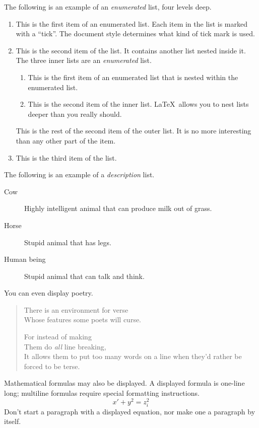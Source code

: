 \documentclass{kluwer}    %
\begin{document}
\begin{article}
The following is an example of an {\em enumerated} list, four levels deep.
\begin{enumerate}
\item  This is the first item of an enumerated list.  Each item 
      in the list is marked with a ``tick''.  The document
      style determines what kind of tick mark is used.
\item  This is the second item of the list.  It contains another
      list nested inside it.  The three inner lists are an {\em enumerated}
      list.
    \begin{enumerate}
       \item This is the first item of an enumerated list that
            is nested within the enumerated list.
          \item This is the second item of the inner list.  \LaTeX\
            allows you to nest lists deeper than you really should.
      \end{enumerate}
      This is the rest of the second item of the outer list.  It
      is no more interesting than any other part of the item.
   \item  This is the third item of the list.
\end{enumerate}


The following is an example of a {\em description} list.
\begin{description}
\item[Cow] Highly intelligent animal that can produce milk out of grass.
\item[Horse] Stupid animal that has legs.
\item[Human being] Stupid animal that can talk and think.
\end{description}

You can even display poetry.
\begin{verse}
   There is an environment for verse \\    %
   Whose features some poets will curse.   %


   For instead of making\\
   Them do {\em all\/} line breaking, \\
   It allows them to put too many words on a line when they'd 
   rather be forced to be terse.
\end{verse}

Mathematical formulas may also be displayed.  A displayed formula is
one-line long; multiline formulas require special formatting
instructions.
   \[  x' + y^{2} = z_{i}^{2}\]
Don't start a paragraph with a displayed equation, nor make
one a paragraph by itself.


\end{article}
\end{document}
